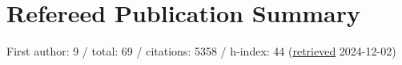 \section*{Refereed Publication Summary}

First author: 9 / total: 69 / citations: 5358 / h-index: 44 (\href{https://ui.adsabs.harvard.edu/#/public-libraries/G0Ow9TGTRyuVT7hbhzailA}{retrieved} 2024-12-02)
